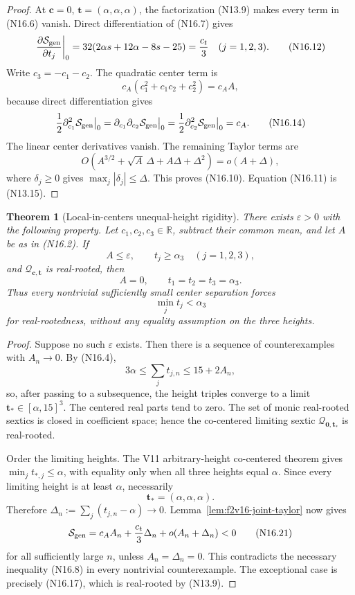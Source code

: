 \documentclass[11pt]{article}
\newtheorem{theorem}{Theorem}[section]
\theoremstyle{definition}
\theoremstyle{remark}
\begin{document}
\begin{proof}
At \(\mathbf c=0\), \(\mathbf t=(\alpha,\alpha,\alpha)\), the
factorization \textup{(N13.9)} makes every term in
\textup{(N16.6)} vanish.  Direct differentiation of
\textup{(N16.7)} gives
\[
 \left.\frac{\partial\mathcal S_{\rm gen}}{\partial t_j}\right|_0
 =32(2\alpha s+12\alpha-8s-25)=\frac{c_t}{3}
 \quad(j=1,2,3).
 \tag{N16.12}
\]
Write \(c_3=-c_1-c_2\).  The quadratic center term is
\[
 c_A(c_1^2+c_1c_2+c_2^2)=c_AA,
 \tag{N16.13}
\]
because direct differentiation gives
\[
 \frac12\partial_{c_1}^2\mathcal S_{\rm gen}\big|_0
 =\partial_{c_1}\partial_{c_2}\mathcal S_{\rm gen}\big|_0
 =\frac12\partial_{c_2}^2\mathcal S_{\rm gen}\big|_0
 =c_A.
 \tag{N16.14}
\]
The linear center derivatives vanish.  The remaining Taylor terms are
\[
 O\!\left(A^{3/2}+\sqrt A\,\Delta+A\Delta+\Delta^2\right)
 =o(A+\Delta),
 \tag{N16.15}
\]
where \(\delta_j\geq0\) gives
\(\max_j|\delta_j|\leq\Delta\).  This proves
\textup{(N16.10)}.  Equation \textup{(N16.11)} is
\textup{(N13.15)}.
\end{proof}

\begin{theorem}[Local-in-centers unequal-height rigidity]
\label{thm:f2v16-local-bridge}
There exists \(\varepsilon>0\) with the following property.  Let
\(c_1,c_2,c_3\in\mathbb R\), subtract their common mean, and let \(A\) be
as in \textup{(N16.2)}.  If
\[
 A\leq\varepsilon,\qquad t_j\geq\alpha_3\quad(j=1,2,3),
 \tag{N16.16}
\]
and \(\mathcal Q_{\mathbf c,\mathbf t}\) is real-rooted, then
\[
 A=0,\qquad t_1=t_2=t_3=\alpha_3.
 \tag{N16.17}
\]
Thus every nontrivial sufficiently small center separation forces
\[
 \min_jt_j<\alpha_3
 \tag{N16.18}
\]
for real-rootedness, without any equality assumption on the three
heights.
\end{theorem}

\begin{proof}
Suppose no such \(\varepsilon\) exists.  Then there is a sequence of
counterexamples with \(A_n\to0\).  By \textup{(N16.4)},
\[
 3\alpha\leq\sum_jt_{j,n}\leq15+2A_n,
 \tag{N16.19}
\]
so, after passing to a subsequence, the height triples converge to a
limit \(\mathbf t_\ast\in[\alpha,15]^3\).  The centered real parts tend
to zero.  The set of monic real-rooted sextics is closed in coefficient
space; hence the co-centered limiting sextic
\(\mathcal Q_{\mathbf0,\mathbf t_\ast}\) is real-rooted.

Order the limiting heights.  The V11 arbitrary-height co-centered theorem
gives \(\min_jt_{\ast,j}\leq\alpha\), with equality only when all three
heights equal \(\alpha\).  Since every limiting height is at least
\(\alpha\), necessarily
\[
 \mathbf t_\ast=(\alpha,\alpha,\alpha).
 \tag{N16.20}
\]
Therefore \(\Delta_n:=\sum_j(t_{j,n}-\alpha)\to0\).
Lemma~\ref{lem:f2v16-joint-taylor} now gives
\[
 \mathcal S_{\rm gen}
 =c_AA_n+\frac{c_t}{3}\Delta_n+o(A_n+\Delta_n)<0
 \tag{N16.21}
\]
for all sufficiently large \(n\), unless
\(A_n=\Delta_n=0\).  This contradicts the necessary inequality
\textup{(N16.8)} in every nontrivial counterexample.  The exceptional case
is precisely \textup{(N16.17)}, which is real-rooted by
\textup{(N13.9)}.
\end{proof}
\end{document}
